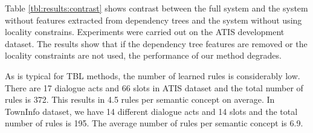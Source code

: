 \documentclass{article}
\newcommand{\efgr}[2]{
  \begin{figure}[htbp]
    \makebox[8.5cm]{\framebox[5cm]{\rule{0pt}{5cm}}}
    \caption{#2}
    \label{#1}
  \end{figure}
}
\begin{document}



Table \ref{tbl:results:contrast} shows contrast between the full system and the system without features extracted from dependency trees and the system without using locality constrains. Experiments were carried out on the ATIS development dataset. The results show that if the dependency tree features are removed or the locality constraints are not used, the performance of our method degrades.

As is typical for TBL methods, the number of learned rules is considerably low. There are 17 dialogue acts and 66 slots in ATIS dataset and the total number of rules is 372. This results in 4.5 rules per semantic concept on average. In TownInfo dataset, we have 14 different dialogue acts and 14 slots and the total number of rules is 195. The average number of rules per semantic concept is 6.9.

\end{document}
